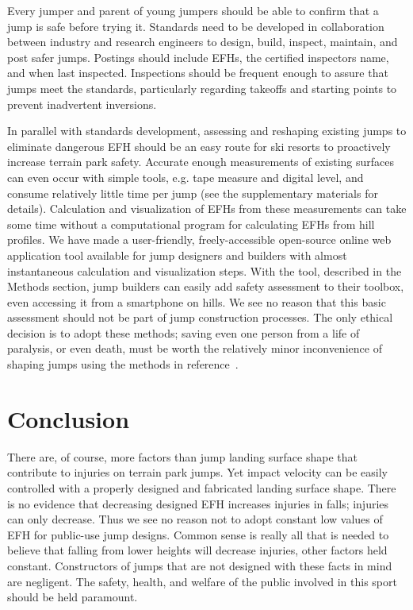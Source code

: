 \documentclass[smallextended]{svjour3}       %
\begin{document}
Every jumper and parent of young jumpers should be able to confirm that a jump
is safe before trying it. Standards need to be developed in collaboration
between industry and research engineers to design, build, inspect, maintain,
and post safer jumps. Postings should include EFHs, the certified inspectors
name, and when last inspected. Inspections should be frequent enough to assure
that jumps meet the standards, particularly regarding takeoffs and starting
points to prevent inadvertent inversions.

In parallel with standards development, assessing and reshaping existing jumps
to eliminate dangerous EFH should be an easy route for ski resorts to
proactively increase terrain park safety. Accurate enough measurements of
existing surfaces can even occur with simple tools, e.g. tape measure and digital
level, and consume relatively little time per jump (see the supplementary
materials for details). Calculation and visualization of EFHs from these
measurements can take some time without a computational program for calculating
EFHs from hill profiles. We have made a user-friendly, freely-accessible
open-source online web application tool available for jump designers and
builders with almost instantaneous calculation and visualization steps.  With
the tool, described in the Methods section, jump builders can easily add safety
assessment to their toolbox, even accessing it from a smartphone on hills.  We
see no reason that this basic assessment should not be part of jump
construction processes. The only ethical decision is to adopt these methods;
saving even one person from a life of paralysis, or even death, must be worth
the relatively minor inconvenience of shaping jumps using the methods in
reference~\cite{Levy2015}.

\section{Conclusion}
\label{sec:conc}
%
There are, of course, more factors than jump landing surface shape that
contribute to injuries on terrain park jumps. Yet impact velocity can be easily
controlled with a properly designed and fabricated landing surface shape. There is no evidence that
decreasing designed EFH increases injuries in falls; injuries can only decrease.  Thus
we see no reason not to adopt constant low values of EFH for public-use jump
designs. Common sense is really all that is needed to believe that falling from
lower heights will decrease injuries, other factors held constant.  
Constructors of jumps that are not designed with these facts in mind are
negligent. The safety, health, and welfare of the public involved in this sport
should be held paramount.
\end{document}
